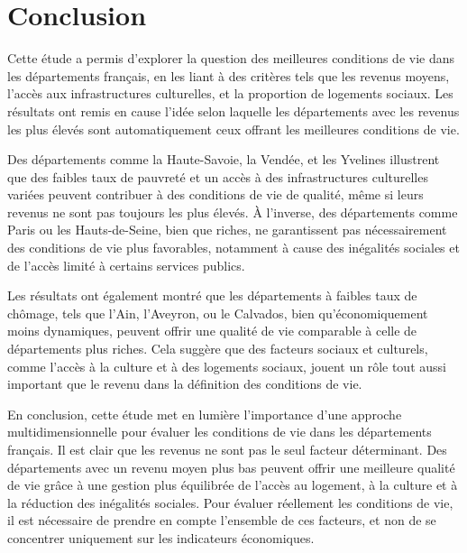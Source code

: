 \documentclass[mstat,12pt]{unswthesis}
\begin{document}
\bigskip

\chapter{Conclusion}\label{conclusion}

Cette étude a permis d'explorer la question des meilleures conditions de
vie dans les départements français, en les liant à des critères tels que
les revenus moyens, l'accès aux infrastructures culturelles, et la
proportion de logements sociaux. Les résultats ont remis en cause l'idée
selon laquelle les départements avec les revenus les plus élevés sont
automatiquement ceux offrant les meilleures conditions de vie.

\medskip

Des départements comme la Haute-Savoie, la Vendée, et les Yvelines
illustrent que des faibles taux de pauvreté et un accès à des
infrastructures culturelles variées peuvent contribuer à des conditions
de vie de qualité, même si leurs revenus ne sont pas toujours les plus
élevés. À l'inverse, des départements comme Paris ou les Hauts-de-Seine,
bien que riches, ne garantissent pas nécessairement des conditions de
vie plus favorables, notamment à cause des inégalités sociales et de
l'accès limité à certains services publics.

\medskip

Les résultats ont également montré que les départements à faibles taux
de chômage, tels que l'Ain, l'Aveyron, ou le Calvados, bien
qu'économiquement moins dynamiques, peuvent offrir une qualité de vie
comparable à celle de départements plus riches. Cela suggère que des
facteurs sociaux et culturels, comme l'accès à la culture et à des
logements sociaux, jouent un rôle tout aussi important que le revenu
dans la définition des conditions de vie.

\medskip

En conclusion, cette étude met en lumière l'importance d'une approche
multidimensionnelle pour évaluer les conditions de vie dans les
départements français. Il est clair que les revenus ne sont pas le seul
facteur déterminant. Des départements avec un revenu moyen plus bas
peuvent offrir une meilleure qualité de vie grâce à une gestion plus
équilibrée de l'accès au logement, à la culture et à la réduction des
inégalités sociales. Pour évaluer réellement les conditions de vie, il
est nécessaire de prendre en compte l'ensemble de ces facteurs, et non
de se concentrer uniquement sur les indicateurs économiques.
\end{document}
